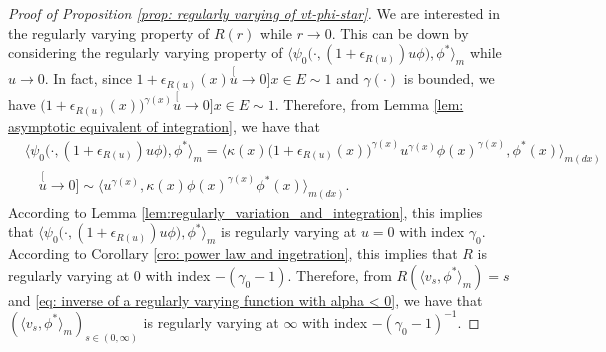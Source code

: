 \documentclass[12pt, a4paper]{amsart}
\theoremstyle{definition}
\numberwithin{equation}{section}
\begin{document}
\begin{proof}[Proof of Proposition \ref{prop: regularly varying of vt-phi-star}]
	We are interested in the regularly varying property of $R(r)$ while $r\to 0$. 
	This can be down by considering the regularly varying property of $\big\langle \psi_0 \big(\cdot ,( 1 + \epsilon_{R(u)} ) u \phi \big), \phi^* \big\rangle_m$ while $u \to 0$.
	In fact, since $1+ \epsilon_{R(u)}(x) \stackrel[u\to 0]{x\in E}{\sim} 1$ and $\gamma(\cdot)$ is bounded, we have $\big(1+ \epsilon_{R(u)}(x)\big)^{\gamma(x)}\stackrel[u\to 0]{x\in E}{\sim} 1$. 
	Therefore, from Lemma \ref{lem: asymptotic equivalent of integration}, we have that
\[\label{eq: }\begin{split}
	&\big\langle \psi_0 \big(\cdot,( 1 + \epsilon_{R(u)} ) u \phi \big), \phi^* \big\rangle_m
	= \big\langle \kappa (x)\big( 1 + \epsilon_{R(u)}(x)\big )^{\gamma(x)} u^{\gamma(x)} \phi(x)^{\gamma(x)} , \phi^*(x) \big\rangle_{m(dx)}
	\\ &\quad \stackrel[u\to 0]{}{\sim}  \langle u^{\gamma(x)} , \kappa (x)\phi(x)^{\gamma(x)} \phi^*(x) \rangle_{m(dx)}.
\end{split}\]
	According to Lemma \ref{lem:regularly_variation_and_integration}, this implies that $\langle \psi_0\big(\cdot,(1+\epsilon_{R(u)})u\phi \big), \phi^* \rangle_m$ is regularly varying at $u = 0$ with index $\gamma_0$. 
	According to Corollary \ref{cro: power law and ingetration}, this implies that $R$ is regularly varying at $0$ with index $-(\gamma_0 - 1)$.
	Therefore, from $R(\langle v_s, \phi^*\rangle_m) = s$ and \eqref{eq: inverse of a regularly varying function with alpha < 0}, we have that $(\langle v_s, \phi^*\rangle_m)_{s\in (0,\infty)}$ is regularly varying at $\infty$ with index $-(\gamma_0 - 1)^{-1}$.
	

\end{proof}
\end{document}
